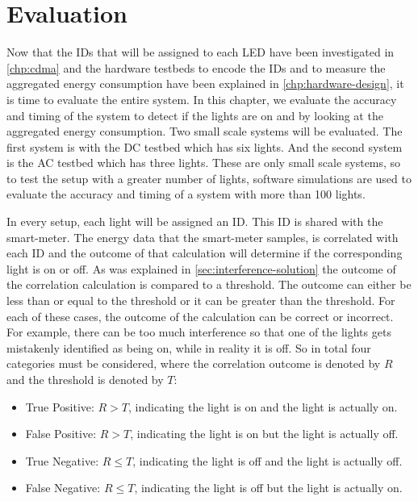 
\chapter{Evaluation}
\label{chp:evaluation}




Now that the IDs that will be assigned to each LED have been investigated in \autoref{chp:cdma} and the hardware testbeds to encode the IDs and to measure the aggregated energy consumption have been explained in \autoref{chp:hardware-design}, it is time to evaluate the entire system.
In this chapter, we evaluate the accuracy and timing of the system to detect if the lights are on and by looking at the aggregated energy consumption.
Two small scale systems will be evaluated.
The first system is with the DC testbed which has six lights.
And the second system is the AC testbed which has three lights.
These are only small scale systems, so to test the setup with a greater number of lights, software simulations are used to evaluate the accuracy and timing of a system with more than 100 lights.




In every setup, each light will be assigned an ID.
This ID is shared with the smart-meter. %
The energy data that the smart-meter samples, is correlated with each ID and the outcome of that calculation will determine if the corresponding light is on or off.
As was explained in \autoref{sec:interference-solution} the outcome of the correlation calculation is compared to a threshold.
The outcome can either be less than or equal to the threshold or it can be greater than the threshold.
For each of these cases, the outcome of the calculation can be correct or incorrect.
For example, there can be too much interference so that one of the lights gets mistakenly identified as being on, while in reality it is off.
So in total four categories must be considered, where the correlation outcome is denoted by $R$ and the threshold is denoted by $T$:




\begin{itemize}

	\item True Positive: $R > T$, indicating the light is on and the light is actually on.

	\item False Positive: $R > T$, indicating the light is on but the light is actually off.

	\item True Negative: $R \le T$, indicating the light is off and the light is actually off.

	\item False Negative: $R \le T$, indicating the light is off but the light is actually on.


\end{itemize}




